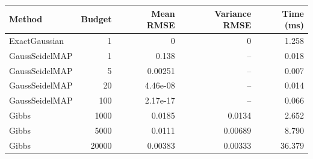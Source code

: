 \begin{tabular}{@{}lrrrr@{}}\toprule
Method & Budget & Mean RMSE & Variance RMSE & Time (ms)\\\midrule
ExactGaussian & 1 & 0 & 0 & 1.258\\
GaussSeidelMAP & 1 & 0.138 & -- & 0.018\\
GaussSeidelMAP & 5 & 0.00251 & -- & 0.007\\
GaussSeidelMAP & 20 & 4.46e-08 & -- & 0.014\\
GaussSeidelMAP & 100 & 2.17e-17 & -- & 0.066\\
Gibbs & 1000 & 0.0185 & 0.0134 & 2.652\\
Gibbs & 5000 & 0.0111 & 0.00689 & 8.790\\
Gibbs & 20000 & 0.00383 & 0.00333 & 36.379\\
\bottomrule\end{tabular}
